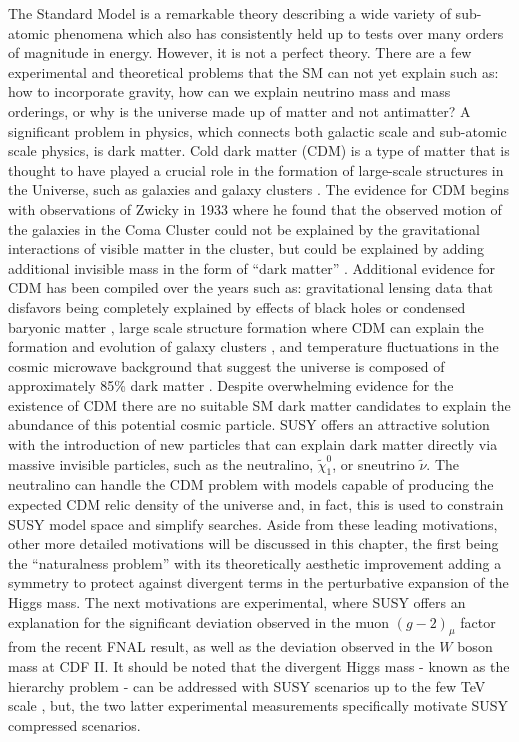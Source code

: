 The Standard Model is a remarkable theory describing a wide variety of sub-atomic phenomena which also has consistently held up to tests over many orders of magnitude in energy. However, it is not a perfect theory. There are a few  experimental and theoretical problems that the SM can not yet explain such as: how to incorporate gravity,  how can we explain neutrino mass and mass orderings, or why is the universe made up of matter and not antimatter?  
A significant problem in physics, which connects both galactic scale and sub-atomic scale physics, is dark matter. Cold dark matter (CDM) is a type of matter that is thought to have played a crucial role in the formation of large-scale structures in the Universe, such as galaxies and galaxy clusters \cite{Garrett:2010hd}. The evidence for CDM begins with observations of Zwicky in 1933 where he found that the observed motion of the galaxies in the Coma Cluster could not be explained by the gravitational interactions of visible matter in the cluster, but could be explained by adding additional invisible mass in the form of ``dark matter'' \cite{Zwicky:1933gu}. Additional evidence for CDM has been compiled over the years such as: gravitational lensing data that disfavors being completely explained by effects of black holes or condensed baryonic matter \cite{Massey:2007lens}, large scale structure formation where CDM can explain the formation and evolution of galaxy clusters \cite{Springel:2005}, and temperature fluctuations in the cosmic microwave background that suggest the universe is composed of approximately 85\% dark matter \cite{Planck:2018vyg}. Despite overwhelming evidence for the existence of CDM there are no suitable SM dark matter candidates to explain the abundance of this potential cosmic particle. SUSY offers an attractive solution with the introduction of new particles that can explain dark matter directly via massive invisible particles, such as the neutralino, $\tilde{\chi}_1^0$, or sneutrino $\tilde{\nu}$. The neutralino can handle the CDM problem with models capable of producing the expected CDM relic density of the universe and, in fact, this is used to constrain SUSY model space and simplify searches. Aside from these leading motivations, other more detailed motivations will be discussed in this chapter, the first being the ``naturalness problem'' with its theoretically aesthetic improvement adding a symmetry to protect against divergent terms in the perturbative expansion of the Higgs mass. The next motivations are experimental, where SUSY offers an explanation for the significant deviation observed in the muon $(g-2)_\mu$ factor from the recent FNAL result, as well as the deviation observed in the $W$ boson mass at CDF II. It should be noted that the divergent Higgs mass - known as the hierarchy problem - can be addressed with SUSY scenarios up to the few TeV scale \cite{Barbieri:1987fn}, but, the two latter experimental measurements specifically motivate SUSY compressed scenarios.



